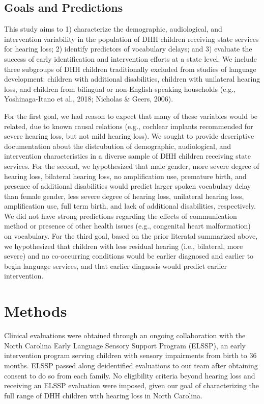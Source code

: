 \documentclass[
  english,
  man]{apa6}
\begin{document}
\hypertarget{goals-and-predictions}{%
\subsection{Goals and Predictions}\label{goals-and-predictions}}

This study aims to 1) characterize the demographic, audiological, and intervention variability in the population of DHH children receiving state services for hearing loss; 2) identify predictors of vocabulary delays; and 3) evaluate the success of early identification and intervention efforts at a state level. We include three subgroups of DHH children traditionally excluded from studies of language development: children with additional disabilities, children with unilateral hearing loss, and children from bilingual or non-English-speaking households (e.g., Yoshinaga-Itano et al., 2018; Nicholas \& Geers, 2006).

For the first goal, we had reason to expect that many of these variables would be related, due to known causal relations (e.g., cochlear implants recommended for severe hearing loss, but not mild hearing loss). We sought to provide descriptive documentation about the distrubution of demographic, audiological, and intervention characteristics in a diverse sample of DHH children receiving state services. For the second, we hypothesized that male gender, more severe degree of hearing loss, bilateral hearing loss, no amplification use, premature birth, and presence of additional disabilities would predict larger spoken vocabulary delay than female gender, less severe degree of hearing loss, unilateral hearing loss, amplification use, full term birth, and lack of additional disabilities, respectively. We did not have strong predictions regarding the effects of communication method or presence of other health issues (e.g., congenital heart malformation) on vocabulary. For the third goal, based on the prior literatal summarized above, we hypothesized that children with less residual hearing (i.e., bilateral, more severe) and no co-occurring conditions would be earlier diagnosed and earlier to begin language services, and that earlier diagnosis would predict earlier intervention.

\hypertarget{methods}{%
\section{Methods}\label{methods}}

Clinical evaluations were obtained through an ongoing collaboration with the North Carolina Early Language Sensory Support Program (ELSSP), an early intervention program serving children with sensory impairments from birth to 36 months. ELSSP passed along deidentified evaluations to our team after obtaining consent to do so from each family. No eligibility criteria beyond hearing loss and receiving an ELSSP evaluation were imposed, given our goal of characterizing the full range of DHH children with hearing loss in North Carolina.
\end{document}
